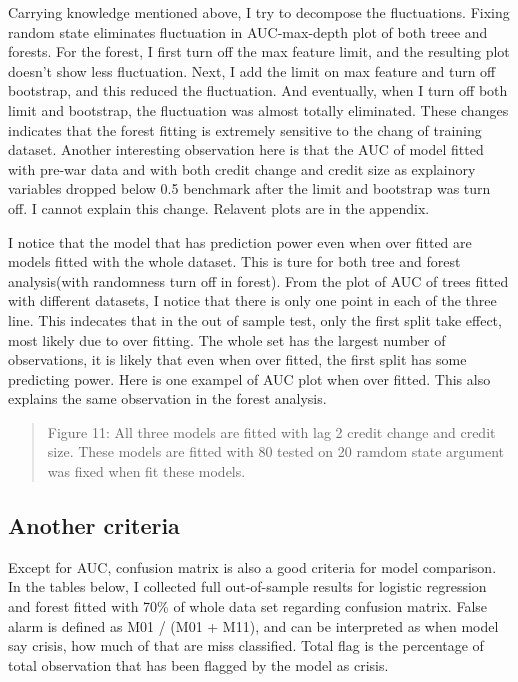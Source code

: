 \documentclass{article}
\newcommand{\ciapdf}[1]{\vspace*{-\parskip}\begin{center}\resizebox{0.75\textwidth}{!}{\texttt{[image: \#1]}}\end{center}}
\begin{document}
Carrying knowledge mentioned above, I try to decompose the fluctuations.
Fixing random state eliminates fluctuation in
AUC-max-depth plot of both treee and forests. For the forest, I first turn off the max
feature limit, and the resulting plot doesn't show less fluctuation.
Next, I add the limit on max feature and turn off bootstrap, and
this reduced the fluctuation. And eventually, when I turn off both limit
and bootstrap, the fluctuation was almost totally eliminated. These
changes indicates that the
forest fitting is extremely sensitive to the chang of training dataset.
Another interesting observation here is that the AUC of model fitted
with pre-war data and with both credit change and credit size as
explainory variables dropped below 0.5 benchmark after the limit and
bootstrap was turn off. I cannot explain this change. Relavent plots are in the appendix.

I notice that the model that has
prediction power even when over fitted are models fitted with the whole
dataset. This is ture for both tree and forest analysis(with
randomness turn off in forest). From the plot of AUC of trees fitted
with different datasets, I notice that there is only one point in each
of the three line. This indecates that in the out of sample test, only
the first split take effect, most likely due to
over fitting. The whole set has the largest number of observations, it is likely that
even when over fitted, the first split has some predicting power. Here
is one exampel of AUC plot when over fitted. This also explains the same
observation in the forest analysis.

\ciapdf{Figure_11.pdf}
\begin{quote}
Figure 11: All three models are fitted with lag 2 credit change and
credit size. These models are fitted with 80%
tested on 20%
ramdom state argument was fixed when fit these models.
\end{quote}

\subsection*{Another criteria}

Except for AUC, confusion matrix is also a good criteria for model
comparison. In the tables below, I collected full out-of-sample results for logistic
regression and forest fitted with 70\% of whole data set regarding confusion matrix. False alarm is defined as
M01 / (M01 + M11), and can be interpreted as when model say crisis, how much of that are
miss classified. Total flag is the percentage of total observation that has been flagged by the model as crisis.
\end{document}
